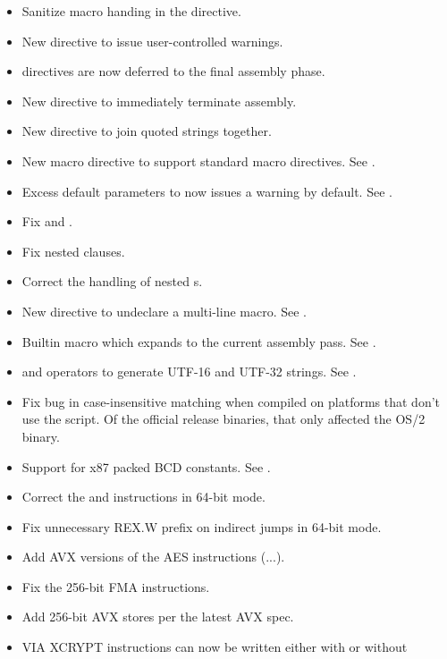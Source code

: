 \begin{itemize}
    \item{Sanitize macro handing in the  directive.}
    \item{New  directive to issue user-controlled warnings.}
    \item{ directives are now deferred to the final assembly phase.}
    \item{New  directive to immediately terminate assembly.}
    \item{New  directive to join quoted strings together.}
    \item{New  macro directive to support standard macro directives. See .}
    \item{Excess default parameters to  now issues a warning by default.
        See .}
    \item{Fix  and .}
    \item{Fix nested  clauses.}
    \item{Correct the handling of nested s.}
    \item{New  directive to undeclare a multi-line macro.
        See .}
    \item{Builtin macro  which expands to the current assembly pass.
        See .}
    \item{ and  operators to generate
        UTF-16 and UTF-32 strings. See .}
    \item{Fix bug in case-insensitive matching when compiled on platforms that
        don't use the  script. Of the official release binaries,
        that only affected the OS/2 binary.}
    \item{Support for x87 packed BCD constants. See .}
    \item{Correct the  and  instructions in 64-bit mode.}
    \item{Fix unnecessary REX.W prefix on indirect jumps in 64-bit mode.}
    \item{Add AVX versions of the AES instructions (...).}
    \item{Fix the 256-bit FMA instructions.}
    \item{Add 256-bit AVX stores per the latest AVX spec.}
    \item{VIA XCRYPT instructions can now be written either with or without
}
\end{itemize}
